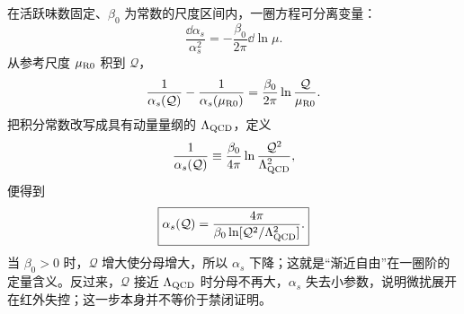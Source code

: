 \begin{derivation}[一圈强耦合演化与尺度参数]
在活跃味数固定、\(\beta_0\) 为常数的尺度区间内，一圈方程可分离变量：
\begin{equation*}
\frac{\dd\alpha_s}{\alpha_s^2}
=-\frac{\beta_0}{2\pi}\dd\ln\mu.
\end{equation*}
从参考尺度 \(\mu_{\rm R0}\) 积到 \(\mathcal Q\)，
\begin{equation*}
\frac1{\alpha_s(\mathcal Q)}
-\frac1{\alpha_s(\mu_{\rm R0})}
=\frac{\beta_0}{2\pi}
\ln\frac{\mathcal Q}{\mu_{\rm R0}}.
\end{equation*}
把积分常数改写成具有动量量纲的 \(\Lambda_{\rm QCD}\)，定义
\begin{equation*}
\frac1{\alpha_s(\mathcal Q)}
\equiv
\frac{\beta_0}{4\pi}
\ln\frac{\mathcal Q^2}{\Lambda_{\rm QCD}^2},
\end{equation*}
便得到
\begin{equation*}
\boxed{
\alpha_s(\mathcal Q)
=\frac{4\pi}{\beta_0
\ln[\mathcal Q^2/\Lambda_{\rm QCD}^2]}.}
\end{equation*}
当 \(\beta_0>0\) 时，\(\mathcal Q\) 增大使分母增大，所以 \(\alpha_s\) 下降；这就是“渐近自由”在一圈阶的定量含义。反过来，\(\mathcal Q\) 接近 \(\Lambda_{\rm QCD}\) 时分母不再大，\(\alpha_s\) 失去小参数，说明微扰展开在红外失控；这一步本身并不等价于禁闭证明。
\end{derivation}

